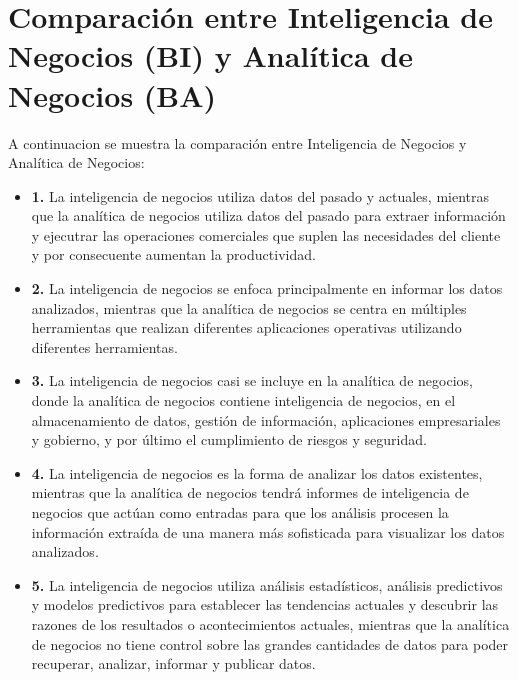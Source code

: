 \documentclass[preprint,12pt]{elsarticle}
\begin{document}
	



\section{Comparación entre Inteligencia de Negocios (BI) y Analítica de Negocios (BA)}
A continuacion se muestra la comparación entre Inteligencia de Negocios y Analítica de Negocios:
	
	\begin{itemize}

	\item{\textbf{1.}} La inteligencia de negocios utiliza datos del pasado y actuales, mientras que la analítica de negocios utiliza 			datos del pasado para extraer información y ejecutrar las operaciones comerciales que suplen las necesidades del cliente y por 		consecuente aumentan la productividad.
	\item{\textbf{2.}} La inteligencia de negocios se enfoca principalmente en informar los datos analizados, mientras que la analítica 	de negocios se centra en múltiples herramientas que realizan diferentes aplicaciones operativas utilizando diferentes 				herramientas.
	\item{\textbf{3.}} La inteligencia de negocios casi se incluye en la analítica de negocios, donde la analítica de negocios contiene 		inteligencia de negocios, en el almacenamiento de datos, gestión de información, aplicaciones empresariales y gobierno, y por 			último el cumplimiento de riesgos y seguridad.
	\item{\textbf{4.}} La inteligencia de negocios es la forma de analizar los datos existentes, mientras que la analítica de negocios 		tendrá informes de inteligencia de negocios que actúan como entradas para que los análisis procesen la información extraída de 		una manera más sofisticada para visualizar los datos analizados.
	\item{\textbf{5.}} La inteligencia de negocios utiliza análisis estadísticos, análisis predictivos y modelos predictivos para 				establecer las tendencias actuales y descubrir las razones de los resultados o acontecimientos actuales, mientras que la 			analítica de negocios no tiene control sobre las grandes cantidades de datos para poder recuperar, analizar, informar y publicar 		datos.

\end{itemize}
\end{document}
